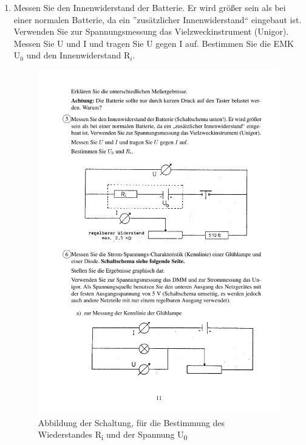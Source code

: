 \documentclass[12pt]{scrartcl}
\begin{document}
\begin{enumerate}
	\item
	Messen Sie den Innenwiderstand der 				Batterie. Er wird größer sein als bei 			einer normalen Batterie, da ein 					”zusätzlicher Innenwiderstand“ eingebaut 	ist. Verwenden Sie zur Spannungsmessung 			das Vielzweckinstrument (Unigor). Messen 	Sie U und I und tragen Sie U gegen I 			auf. Bestimmen Sie die EMK $\text{U}_0$ und 		den Innenwiderstand $\text{R}_i$.
	
	\begin{figure}[htbp] 
	  \centering
	    \includegraphics[trim = 1mm 102mm 1mm 55mm, clip, scale = 1]{abb_versuch_5_6a.pdf}
	  	\caption[Abbildung der Schaltung, für die Bestimmung des Wiederstandes R und der Spannung U]{Abbildung der Schaltung, für die Bestimmung des Wiederstandes R\textsubscript{i} und der Spannung U\textsubscript{0}\footnotemark}
	  \label{fig:abb_versuch_5}
	\end{figure}
	\newpage
	

\end{enumerate}
\end{document}
